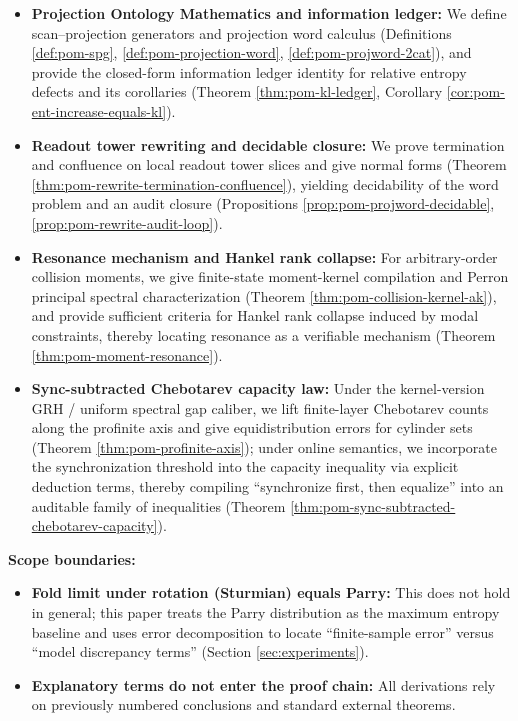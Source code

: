 \begin{itemize}
  \item \textbf{Projection Ontology Mathematics and information ledger:} We define scan--projection generators and projection word calculus (Definitions \ref{def:pom-spg}, \ref{def:pom-projection-word}, \ref{def:pom-projword-2cat}), and provide the closed-form information ledger identity for relative entropy defects and its corollaries (Theorem \ref{thm:pom-kl-ledger}, Corollary \ref{cor:pom-ent-increase-equals-kl}).
  \item \textbf{Readout tower rewriting and decidable closure:} We prove termination and confluence on local readout tower slices and give normal forms (Theorem \ref{thm:pom-rewrite-termination-confluence}), yielding decidability of the word problem and an audit closure (Propositions \ref{prop:pom-projword-decidable}, \ref{prop:pom-rewrite-audit-loop}).
  \item \textbf{Resonance mechanism and Hankel rank collapse:} For arbitrary-order collision moments, we give finite-state moment-kernel compilation and Perron principal spectral characterization (Theorem \ref{thm:pom-collision-kernel-ak}), and provide sufficient criteria for Hankel rank collapse induced by modal constraints, thereby locating resonance as a verifiable mechanism (Theorem \ref{thm:pom-moment-resonance}).
  \item \textbf{Sync-subtracted Chebotarev capacity law:} Under the kernel-version GRH / uniform spectral gap caliber, we lift finite-layer Chebotarev counts along the profinite axis and give equidistribution errors for cylinder sets (Theorem \ref{thm:pom-profinite-axis}); under online semantics, we incorporate the synchronization threshold into the capacity inequality via explicit deduction terms, thereby compiling ``synchronize first, then equalize'' into an auditable family of inequalities (Theorem \ref{thm:pom-sync-subtracted-chebotarev-capacity}).
\end{itemize}

\textbf{Scope boundaries:}
\begin{itemize}
  \item \textbf{Fold limit under rotation (Sturmian) equals Parry:} This does not hold in general; this paper treats the Parry distribution as the maximum entropy baseline and uses error decomposition to locate ``finite-sample error'' versus ``model discrepancy terms'' (Section \ref{sec:experiments}).
  \item \textbf{Explanatory terms do not enter the proof chain:} All derivations rely on previously numbered conclusions and standard external theorems.
\end{itemize}

